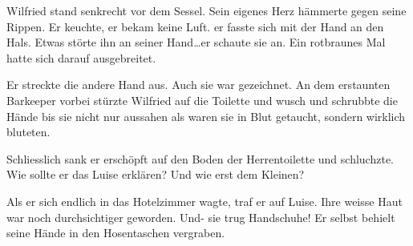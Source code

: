 Wilfried stand senkrecht vor dem Sessel. Sein eigenes Herz hämmerte gegen seine Rippen. Er keuchte, er bekam keine Luft. er fasste sich mit der Hand an den Hals. Etwas störte ihn an seiner Hand\dots er schaute sie an. Ein rotbraunes Mal hatte sich darauf ausgebreitet. 

Er streckte die andere Hand aus. Auch sie war gezeichnet. An dem erstaunten Barkeeper vorbei stürzte Wilfried auf die Toilette und wusch und schrubbte die Hände bis sie nicht nur aussahen als waren sie in Blut getaucht, sondern wirklich bluteten. 


Schliesslich sank er erschöpft auf den Boden der Herrentoilette und schluchzte. Wie sollte er das Luise erklären? Und wie erst dem Kleinen?

Als er sich endlich in das Hotelzimmer wagte, traf er auf Luise. Ihre weisse Haut war noch durchsichtiger geworden. Und- sie trug Handschuhe! Er selbst behielt seine Hände in den Hosentaschen vergraben.

